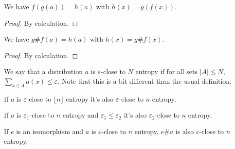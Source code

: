 \begin{lemma}
    \label{linear_combination_linear_combination}
    \leanok
    We have $f(g(a)) = h(a)$ with $h(x) = g(f(x))$.
\end{lemma}

\begin{proof}
    \leanok
    By calculation.
\end{proof}

\begin{lemma}
    \label{linear_combination_apply}
    \leanok
    We have $g \# f(a) = h(a)$ with $h(x) = g\# f(x)$.
\end{lemma}

\begin{proof}
    \leanok
    By calculation.
\end{proof}

\begin{definition}
    \label{close_high_entropy}
    \leanok
    We say that a distribution $a$ is $\varepsilon$-close to $N$ entropy if for all sets $|A| \leq N$,
    $\sum_{x \in A} a(x) \leq \varepsilon$. Note that this is a bit different than the usual definition.
\end{definition}

\begin{proposition}
    \label{close_high_entropy_of_floor}
    \leanok
    If $a$ is $\varepsilon$-close to $\lfloor n \rfloor$ entropy it's also $\varepsilon$-close to $n$ entropy.
\end{proposition}

\begin{proposition}
    \label{close_high_entropy_of_le}
    \leanok
    If $a$ is $\varepsilon_1$-close to $n$ entropy and $\varepsilon_1 \leq \varepsilon_2$ it's also $\varepsilon_2$-close to $n$ entropy.
\end{proposition}

\begin{lemma}
    \label{close_high_entropy_apply_equiv}
    \leanok
    If $e$ is an isomorphism and $a$ is $\varepsilon$-close to $n$ entropy, $e \# a$ is also $\varepsilon$-close to $n$ entropy.
\end{lemma}

